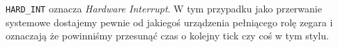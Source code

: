 \texttt{HARD\_INT} oznacza \textit{Hardware Interrupt}. W tym przypadku jako przerwanie systemowe dostajemy pewnie od jakiegoś urządzenia pełniącego rolę zegara i oznaczają że powinniśmy przesunąć czas o kolejny tick czy coś w tym stylu. 